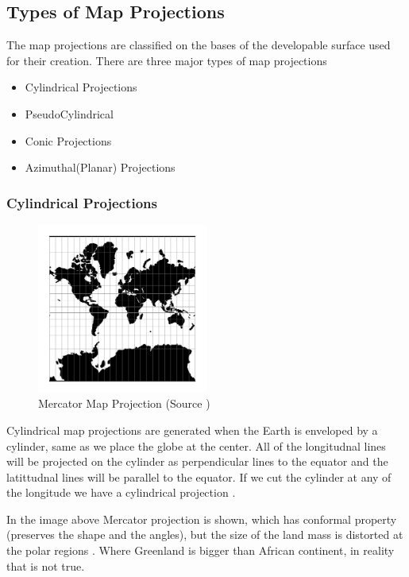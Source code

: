 \subsection{Types of Map Projections}

The map projections are classified on the bases of the developable surface used for their creation. There are three major types of map projections

\begin{itemize}
    \item Cylindrical Projections
    \item PseudoCylindrical
    \item Conic Projections
    \item Azimuthal(Planar) Projections
\end{itemize}

\subsubsection{Cylindrical Projections}
\begin{figure}[h]
    \centering
    \includegraphics[width=0.5\textwidth]{figures/chapter-3/merc.png}
    \caption{Mercator Map Projection (Source \cite{PROJ_SITE})}
    \label{fig:merc}
\end{figure}

Cylindrical map projections are generated when the Earth is enveloped by a cylinder, same as we place the globe at the center. All of the longitudnal lines will be projected on the cylinder as perpendicular lines to the equator and the latittudnal lines  will be parallel to the equator. If we cut the cylinder at any of the longitude we have a cylindrical projection \cite{Snyder1982}.

In the image above Mercator projection is shown, which has conformal property (preserves the shape and the angles), but the size of the land mass is distorted at the polar regions \cite{GISGEO_Cylinder}. Where Greenland is bigger than African continent, in reality that is not true.


